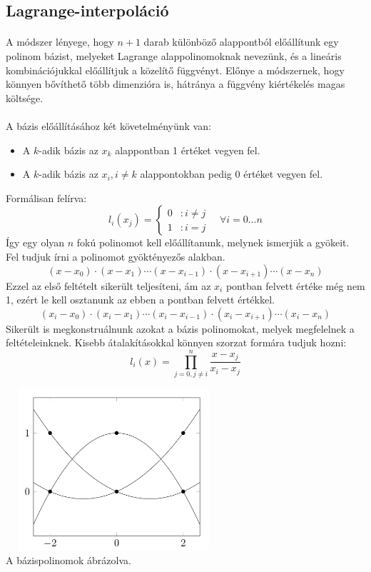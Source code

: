 \documentclass{elteikthesis}
\begin{document}
\subsection{Lagrange-interpoláció}
\paragraph{}
A módszer lényege, hogy $n+1$ darab különböző alappontból előállítunk egy polinom bázist, melyeket Lagrange alappolinomoknak nevezünk, és a lineáris kombinációjukkal előállítjuk a közelítő függvényt. Előnye a módszernek, hogy könnyen bővíthető több dimenzióra is, hátránya a függvény kiértékelés magas költsége.
\paragraph{}
A bázis előállításához két követelményünk van:
\begin{itemize}
\item A $k$-adik bázis az $x_k$ alappontban 1 értéket vegyen fel.
\item A $k$-adik bázis az $x_i, i \neq k$ alappontokban pedig 0 értéket vegyen fel.
\end{itemize}
Formálisan felírva:
$$
l_i(x_j) =
\left\{
  \begin{array}{lr}
    0 & : i \neq j\\
    1 & : i = j
  \end{array}
\right.
\quad \forall i = 0 \dots n
$$
Így egy olyan $n$ fokú polinomot kell előállítanunk, melynek ismerjük a gyökeit. Fel tudjuk írni a polinomot gyöktényezős alakban.
$$
(x-x_0)\cdot(x-x_1)\cdots(x-x_{i-1})\cdot(x-x_{i+1})\cdots(x-x_n)
$$
Ezzel az első feltételt sikerült teljesíteni, ám az $x_i$ pontban felvett értéke még nem 1, ezért le kell osztanunk az ebben a pontban felvett értékkel.
$$
(x_i-x_0)\cdot(x_i-x_1)\cdots(x_i-x_{i-1})\cdot(x_i-x_{i+1})\cdots(x_i-x_n)
$$
Sikerült is megkonstruálnunk azokat a bázis polinomokat, melyek megfelelnek a feltételeinknek. Kisebb átalakításokkal könnyen szorzat formára tudjuk hozni:
$$
l_i(x) = \prod_{j = 0, j \neq i}^{n} \frac{x-x_j}{x_i-x_j}
$$
\begin{center}
\includegraphics[width=8cm,height=6cm]{pics/lagrange_basis}\\
{\footnotesize A bázispolinomok ábrázolva.}
\end{center}
\end{document}

